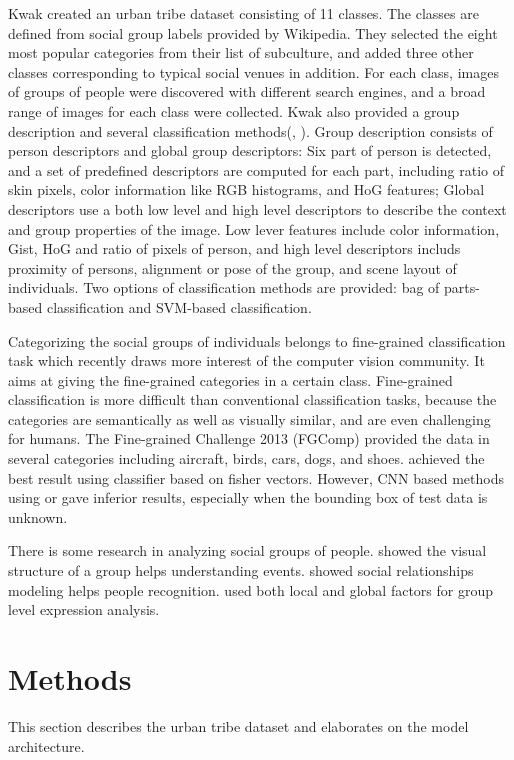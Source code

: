 \documentclass[10pt,twocolumn,letterpaper]{article}
\begin{document}
Kwak \etal created an urban tribe dataset consisting of 11 classes\cite{urbantribe2}. The classes are defined from social group labels provided by Wikipedia. They selected the eight most popular categories from their list of subculture, and added three other classes corresponding to typical social venues  in addition. For each class, images of groups of people were discovered with different search engines, and a broad range of images for each class were collected.  Kwak \etal also provided a group description and several classification methods(\cite{urbantribe2}, \cite{urbantribe}). Group description consists of person descriptors and global group descriptors: Six part of person is detected, and a set of predefined descriptors are computed for each part, including ratio of skin pixels, color information like RGB histograms, and HoG features; Global descriptors use a both low level and high level descriptors to describe the context and group properties of the image. Low lever features  include color information, Gist, HoG and ratio of pixels of person, and high level descriptors includs proximity of persons, alignment or pose of the group, and scene layout of individuals. Two options of classification methods are provided: bag of parts-based classification and SVM-based classification.

Categorizing the social groups of individuals belongs to fine-grained classification task which recently draws more interest of the computer vision community. It aims at giving the fine-grained categories in a certain class. Fine-grained classification is more difficult than conventional classification tasks, because the categories are semantically as well as visually similar, and are even challenging for humans. The Fine-grained Challenge 2013 (FGComp) provided the data in several categories including aircraft, birds, cars, dogs, and shoes. \cite{finegrain} achieved the best result using classifier based on fisher vectors. However, CNN based methods using \cite{caffe} or \cite{decaf} gave inferior results, especially when the bounding box of test data is unknown.

There is some research in analyzing social groups of people. \cite{groupstructure} showed the visual structure of a group helps understanding events. \cite{socialrelationship} showed social relationships modeling helps people recognition. \cite{happiest} used both local and global factors for group level expression analysis.


\section{Methods}
This section describes the urban tribe dataset and elaborates on the model architecture.
\end{document}

